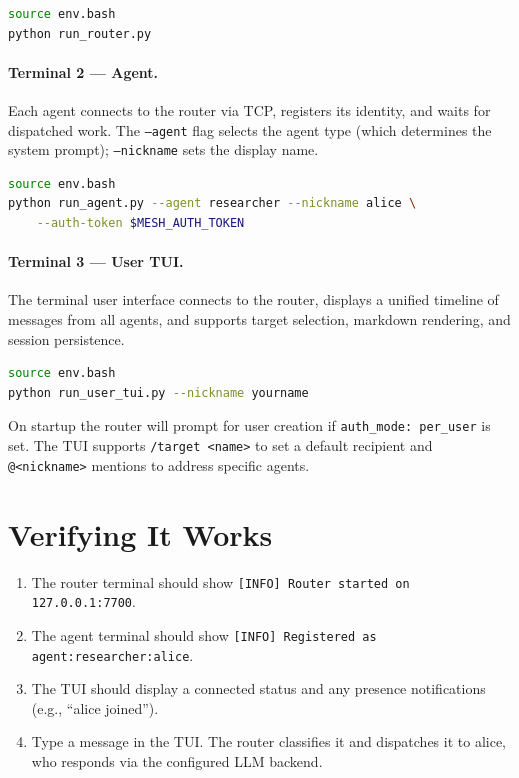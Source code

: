 \documentclass[11pt,letterpaper]{report}
\newcommand{\code}[1]{\texttt{#1}}
\begin{document}
\begin{lstlisting}[language=bash]
source env.bash
python run_router.py
\end{lstlisting}

\paragraph{Terminal 2 --- Agent.}
Each agent connects to the router via TCP, registers its identity,
and waits for dispatched work. The \code{--agent} flag selects the
agent type (which determines the system prompt); \code{--nickname} sets
the display name.

\begin{lstlisting}[language=bash]
source env.bash
python run_agent.py --agent researcher --nickname alice \
    --auth-token $MESH_AUTH_TOKEN
\end{lstlisting}

\paragraph{Terminal 3 --- User TUI.}
The terminal user interface connects to the router, displays a unified
timeline of messages from all agents, and supports target selection,
markdown rendering, and session persistence.

\begin{lstlisting}[language=bash]
source env.bash
python run_user_tui.py --nickname yourname
\end{lstlisting}

On startup the router will prompt for user creation if
\code{auth\_mode: per\_user} is set. The TUI supports
\code{/target~<name>} to set a default recipient and
\code{@<nickname>} mentions to address specific agents.

\section{Verifying It Works}

\begin{enumerate}[nosep]
  \item The router terminal should show
        \code{[INFO] Router started on 127.0.0.1:7700}.
  \item The agent terminal should show
        \code{[INFO] Registered as agent:researcher:alice}.
  \item The TUI should display a connected status and any presence
        notifications (e.g., ``alice joined'').
  \item Type a message in the TUI. The router classifies it and
        dispatches it to alice, who responds via the configured LLM
        backend.
\end{enumerate}
\end{document}
